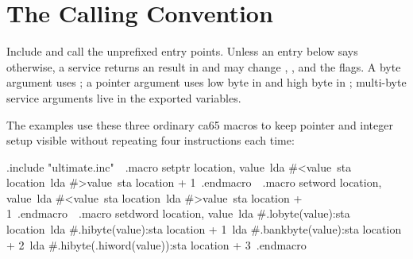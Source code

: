 

\section{The Calling Convention}

Include  and call the unprefixed entry points. Unless an
entry below says otherwise, a service returns an  result in
 and may change , ,  and the flags. A byte argument
uses ; a pointer argument uses low byte in  and high byte in
; multi-byte service arguments live in the exported 
variables.

The examples use these three ordinary ca65 macros to keep pointer and integer setup
visible without repeating four instructions each time:

\begin{listingbox}
\hspace*{2em}.include "ultimate.inc"\
\
.macro setptr location, value\
\hspace*{2em}lda \#<value\
\hspace*{2em}sta location\
\hspace*{2em}lda \#>value\
\hspace*{2em}sta location + 1\
.endmacro\
\
.macro setword location, value\
\hspace*{2em}lda \#<value\
\hspace*{2em}sta location\
\hspace*{2em}lda \#>value\
\hspace*{2em}sta location + 1\
.endmacro\
\
.macro setdword location, value\
\hspace*{2em}lda \#.lobyte(value):sta location\
\hspace*{2em}lda \#.hibyte(value):sta location + 1\
\hspace*{2em}lda \#.bankbyte(value):sta location + 2\
\hspace*{2em}lda \#.hibyte(.hiword(value)):sta location + 3\
.endmacro
\end{listingbox}

